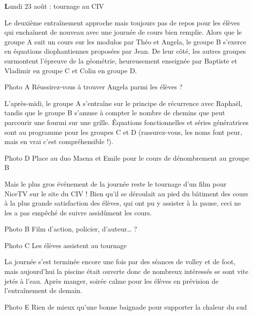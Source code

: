 \begin{center}
{\textbf Lundi 23 août : tournage au CIV}
\end{center}
\vspace{2mm}

Le deuxième entraînement approche mais toujours pas de repos pour les élèves qui enchaînent de nouveau avec une journée de cours bien remplie. Alors que le groupe A suit un cours sur les modulos par Théo et Angela, le groupe B s’exerce en équations diophantiennes proposées par Jean. De leur côté, les autres groupes surmontent l’épreuve de la géométrie, heureusement enseignée par Baptiste et Vladimir en groupe C et Colin en groupe D.

Photo A
Réussirez-vous à trouver Angela parmi les élèves ?

L’après-midi, le groupe A s’entraîne sur le principe de récurrence avec Raphaël, tandis que le groupe B s’amuse à compter le nombre de chemins que peut parcourir une fourmi sur une grille. Équations fonctionnelles et séries génératrices sont au programme pour les groupes C et D (rassurez-vous, les noms font peur, mais en vrai c’est compréhensible !). 

Photo D
Place au duo Maena et Emile pour le cours de dénombrement au groupe B


Mais le plus gros événement de la journée reste le tournage d’un film pour NiceTV sur le site du CIV ! Bien qu’il se déroulait au pied du bâtiment des cours à la plus grande satisfaction des élèves, qui ont pu y assister à la pause, ceci ne les a pas empêché de suivre assidûment les cours.

Photo B
Film d’action, policier, d’auteur… ?

Photo C
Les élèves assistent au tournage

La journée s’est terminée encore une fois par des séances de volley et de foot, mais aujourd’hui la piscine était ouverte donc de nombreux intéressés se sont vite jetés à l’eau. Après manger, soirée calme pour les élèves en prévision de l’entraînement de demain.

Photo E
Rien de mieux qu’une bonne baignade pour supporter la chaleur du sud